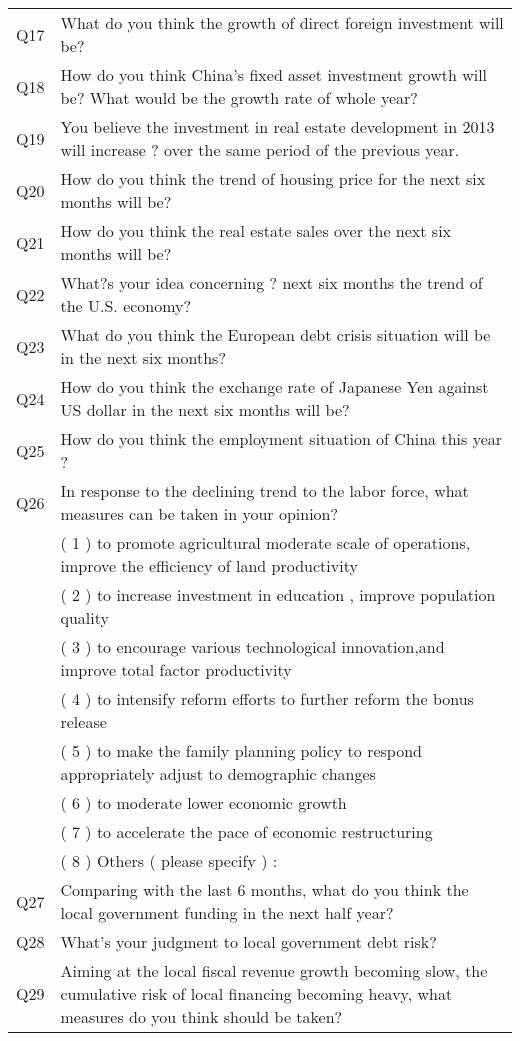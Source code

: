 \documentclass[10pt]{article}
\begin{document}
\begin{longtable}{p{1.5cm}p{13.5cm}}
Q17	&	What do you think the growth of direct foreign investment will be?	\\
Q18	&	How do you think China's fixed asset investment growth will be? What would be the growth rate of whole year?	\\
Q19	&	You believe the investment in real estate development in 2013 will increase ?  over the same period of the previous year.	\\
Q20	&	How do you think the trend of housing price for the next six months will be?	\\
Q21	&	How do you think the real estate sales over the next six months will be? 	\\
Q22	&	What?s your idea concerning ? next six months the trend of the U.S. economy? 	\\
Q23	&	What do you think the European debt crisis situation will be in the next six months?	\\
Q24	&	How do you think the exchange rate of Japanese Yen against US dollar in the next six months will be? 	\\
Q25	&	How do you think the employment situation of China this year ?	\\
Q26	&	In response to the declining trend to the labor force,  what measures can be taken in your opinion? 	\\
	&	( 1 ) to promote agricultural moderate scale of operations, improve the efficiency of land productivity	\\
	&	( 2 ) to increase investment in education , improve population quality	\\
	&	( 3 ) to encourage various technological innovation,and improve total factor productivity	\\
	&	( 4 ) to intensify reform efforts to further reform the bonus release	\\
	&	( 5 ) to make the family planning policy to respond appropriately adjust to demographic changes	\\
	&	( 6 ) to moderate lower economic growth	\\
	&	( 7 ) to accelerate the pace of economic restructuring	\\
	&	( 8 ) Others ( please specify ) :	\\
Q27	&	Comparing with the last 6 months, what do you think the local government funding in the next half year?	\\
Q28	&	What's your judgment to local government debt risk? 	\\
Q29	&	Aiming at the local fiscal revenue growth becoming slow, the cumulative risk of local financing becoming heavy, what measures do you think should be taken? 	\\

\end{longtable}
\end{document}
